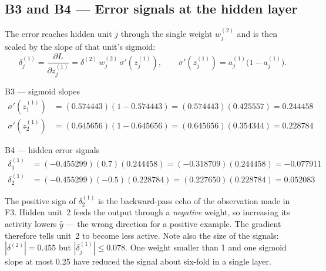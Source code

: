 \documentclass[11pt]{article}
\begin{document}
\subsection{B3 and B4 --- Error signals at the hidden layer}\label{sec:b34}
The error reaches hidden unit $j$ through the single weight $w^{(2)}_j$ and is then scaled by the slope of that unit's sigmoid:
\[
\delta^{(1)}_j=\frac{\partial L}{\partial z^{(1)}_j}=\delta^{(2)}\,w^{(2)}_j\,\sigma'(z^{(1)}_j),\qquad \sigma'(z^{(1)}_j)=a^{(1)}_j\bigl(1-a^{(1)}_j\bigr).
\]
\begin{example}{B3 --- sigmoid slopes}
\begin{align*}
\sigma'(z^{(1)}_1)&=(0.574443)(1-0.574443)=(0.574443)(0.425557)=\mathbf{0.244458}\\
\sigma'(z^{(1)}_2)&=(0.645656)(1-0.645656)=(0.645656)(0.354344)=\mathbf{0.228784}
\end{align*}
\end{example}
\begin{example}{B4 --- hidden error signals}
\begin{align*}
\delta^{(1)}_1&=(-0.455299)(0.7)(0.244458)=(-0.318709)(0.244458)=\mathbf{-0.077911}\\
\delta^{(1)}_2&=(-0.455299)(-0.5)(0.228784)=(0.227650)(0.228784)=\mathbf{0.052083}
\end{align*}
\end{example}
The positive sign of $\delta^{(1)}_2$ is the backward-pass echo of the observation made in F3. Hidden unit~2 feeds the output through a \emph{negative} weight, so increasing its activity lowers $\hat y$ --- the wrong direction for a positive example. The gradient therefore tells unit~2 to become less active. Note also the size of the signals: $|\delta^{(2)}|=0.455$ but $|\delta^{(1)}_j|\le0.078$. One weight smaller than 1 and one sigmoid slope at most 0.25 have reduced the signal about six-fold in a single layer.
\end{document}
